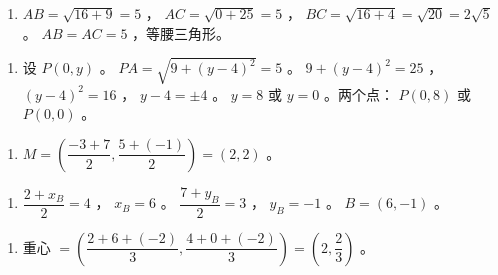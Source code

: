 \begin{answer}
\begin{enumerate}
  \item $AB = \sqrt{16+9} = 5$ ， $AC = \sqrt{0+25} = 5$ ， $BC = \sqrt{16+4} = \sqrt{20} = 2\sqrt{5}$ 。 $AB = AC = 5$ ，等腰三角形。
\end{enumerate}


\begin{enumerate}
  \item 设 $P(0, y)$ 。 $PA = \sqrt{9 + (y-4)^2} = 5$ 。 $9 + (y-4)^2 = 25$ ， $(y-4)^2 = 16$ ， $y - 4 = \pm 4$ 。 $y = 8$ 或 $y = 0$ 。两个点： $P(0, 8)$ 或 $P(0, 0)$ 。
\end{enumerate}


\begin{enumerate}
  \item $M = \left(\dfrac{-3+7}{2}, \dfrac{5+(-1)}{2}\right) = (2, 2)$ 。
\end{enumerate}


\begin{enumerate}
  \item $\dfrac{2+x_B}{2} = 4$ ， $x_B = 6$ 。 $\dfrac{7+y_B}{2} = 3$ ， $y_B = -1$ 。 $B = (6, -1)$ 。
\end{enumerate}


\begin{enumerate}
  \item 重心 $= \left(\dfrac{2+6+(-2)}{3}, \dfrac{4+0+(-2)}{3}\right) = \left(2, \dfrac{2}{3}\right)$ 。
\end{enumerate}


\end{answer}
